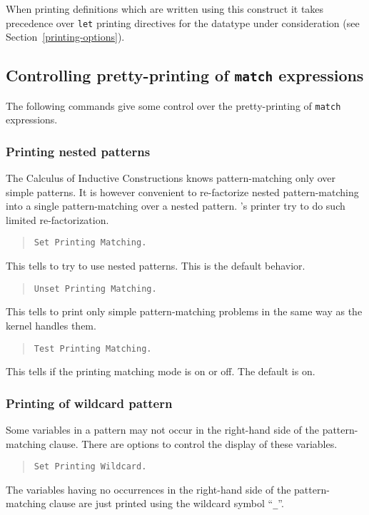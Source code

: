 When printing definitions which are written using this construct it
takes precedence over {\tt let} printing directives for the datatype
under consideration (see Section~\ref{printing-options}).

\subsection{Controlling pretty-printing of {\tt match} expressions
\label{printing-options}}

The following commands give some control over the pretty-printing of
{\tt match} expressions.

\subsubsection{Printing nested patterns
\label{SetPrintingMatching}
}

The Calculus of Inductive Constructions knows pattern-matching only
over simple patterns. It is however convenient to re-factorize nested
pattern-matching into a single pattern-matching over a nested pattern.
{\Coq}'s printer try to do such limited re-factorization.

\begin{quote}
{\tt Set Printing Matching.}
\end{quote}
This tells {\Coq} to try to use nested patterns. This is the default
behavior.

\begin{quote}
{\tt Unset Printing Matching.}
\end{quote}
This tells {\Coq} to print only simple pattern-matching problems in
the same way as the {\Coq} kernel handles them.

\begin{quote}
{\tt Test Printing Matching.}
\end{quote}
This tells if the printing matching mode is on or off. The default is
on.

\subsubsection{Printing of wildcard pattern
}

Some variables in a pattern may not occur in the right-hand side of
the pattern-matching clause.  There are options to control the
display of these variables.

\begin{quote}
{\tt Set Printing Wildcard.}
\end{quote}
The variables having no occurrences in the right-hand side of the
pattern-matching clause are just printed using the wildcard symbol
``{\tt \_}''.

